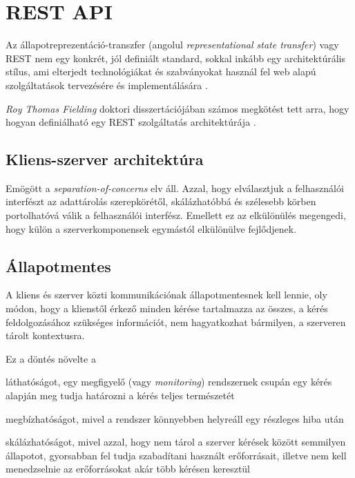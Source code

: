\section{REST API}

Az állapotreprezentáció-transzfer (angolul \emph{representational state transfer}) vagy REST nem egy konkrét, jól definiált standard, sokkal inkább egy architektúrális stílus, ami elterjedt technológiákat és szabványokat használ fel web alapú szolgáltatások tervezésére és implementálására \cite{richards2006representational}. \par

\emph{Roy Thomas Fielding} doktori disszertációjában számos megkötést tett arra, hogy hogyan definiálható egy REST szolgáltatás architektúrája \cite{fielding2000architectural}. 

\subsection{Kliens-szerver architektúra}
Emögött a \emph{separation-of-concerns} elv áll. Azzal, hogy elválasztjuk a felhasználói interfészt az adattárolás szerepkörétől, skálázhatóbbá és szélesebb körben portolhatóvá válik a felhasználói interfész. Emellett ez az elkülönülés megengedi, hogy külön a szerverkomponensek egymástól elkülönülve fejlődjenek.

\subsection{Állapotmentes}
A kliens és szerver közti kommunikációnak állapotmentesnek kell lennie, oly módon, hogy a klienstől érkező minden kérése tartalmazza az összes, a kérés feldolgozásához szükséges információt, nem hagyatkozhat bármilyen, a szerveren tárolt kontextusra. \par

Ez a döntés növelte a 
\begin{listing}
	\item láthatóságot, egy megfigyelő (vagy \emph{monitoring}) rendszernek csupán egy kérés alapján meg tudja határozni a kérés teljes természetét
	\item megbízhatóságot, mivel a rendszer könnyebben helyreáll egy részleges hiba után
	\item skálázhatóságot, mivel azzal, hogy nem tárol a szerver kérések között semmilyen állapotot, gyorsabban fel tudja szabadítani használt erőforrásait, illetve nem kell menedzselnie az erőforrásokat akár több kérésen keresztül
\end{listing}

